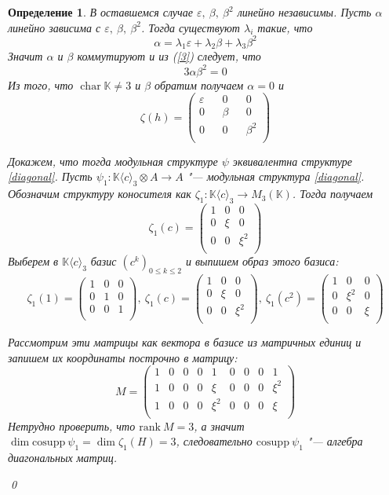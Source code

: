 \documentclass[12pt, reqno, a4paper, oneside, notitlepage]{amsart}
\makeatletter
\theoremstyle{mytheoremstyle}
\theoremstyle{myremarkstyle}
\newtheorem{definition}[theorem]{Определение}
\numberwithin{equation}{section}
\renewenvironment{proof}[1][\proofname]{\par\indent {\bfseries #1\@addpunct{.} }}{\qed}
\DeclareMathOperator{\chr}{char}
\makeatother
\begin{document}
\begin{definition}
\begin{proof}
	В оставшемся случае $\varepsilon,\ \beta,\ \beta^2$ линейно независимы.
	Пусть $\alpha$ линейно зависима с $\varepsilon,\ \beta,\ \beta^2$. Тогда существуют $\lambda_i$ такие, что 
	\[
	  \alpha = \lambda_1\varepsilon + \lambda_2\beta + \lambda_3\beta^2
	\]
	Значит $\alpha$  и $\beta$ коммутируют и из (\ref{3}) следует, что 
	\[
	  3\alpha\beta^2 = 0
	\]
	Из того, что $\chr \mathbb{K} \neq 3$ и $\beta$ обратим получаем $\alpha = 0$ и 
	\[
	  \zeta(h) = \begin{pmatrix} 
		\varepsilon && 0 && 0\\
		0 && \beta && 0\\
		0 && 0 && \beta^2\\
	  \end{pmatrix}
	\]

	Докажем, что тогда модульная структуре $\psi$ эквивалентна структуре \ref{diagonal}.
    Пусть $\psi_1: \mathbb{K}\langle c\rangle_3 \otimes A \to A$ "--- модульная структура \ref{diagonal}.
	Обозначим структуру коносителя как $\zeta_1:\mathbb{K}\langle c\rangle_3 \to M_3(\mathbb{K})$. Тогда получаем \[
    \zeta_1(c) = \begin{pmatrix}
        1 & 0 & 0\\
        0 & \xi & 0\\
        0 & 0 & \xi^2\\
    \end{pmatrix}
    \]
    Выберем в $\mathbb{K}\langle c\rangle_3$  базис $(c^k)_{0 \leq k \leq 2}$ и выпишем образ этого базиса:
    \[
    \zeta_1(1) = \begin{pmatrix}
        1 & 0 & 0\\
        0 & 1 & 0\\
        0 & 0 & 1\\
    \end{pmatrix},\
    \zeta_1(c) = \begin{pmatrix}
        1 & 0 & 0\\
        0 & \xi & 0\\
        0 & 0 & \xi^2\\
    \end{pmatrix},\ 
    \zeta_1(c^2) = \begin{pmatrix}
        1 & 0 & 0\\
        0 & \xi^2 & 0\\
        0 & 0 & \xi\\
    \end{pmatrix}
    \]

    Рассмотрим эти матрицы как вектора в базисе из матричных единиц и запишем их координаты построчно в матрицу: \[
        M = \begin{pmatrix}
            1 & 0 & 0 & 0 & 1 & 0 & 0 & 0 & 1\\
            1 & 0 & 0 & 0 & \xi & 0 & 0 & 0 & \xi^2\\
            1 & 0 & 0 & 0 & \xi^2 & 0 & 0 & 0 & \xi\\
        \end{pmatrix}
    \]
    Нетрудно проверить, что $\mathrm{rank}\ M = 3$, а значит $\dim \mathrm{cosupp}\ \psi_1 = \dim \zeta_1(H) = 3$, следовательно $\mathrm{cosupp}\ \psi_1$ "--- алгебра диагональных матриц.


\end{proof}
\end{definition}
\end{document}
